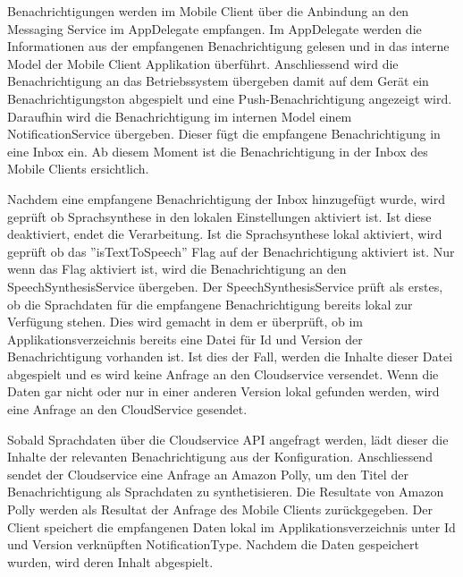 Benachrichtigungen werden im Mobile Client über die Anbindung an den Messaging Service im AppDelegate empfangen.
Im AppDelegate werden die Informationen aus der empfangenen Benachrichtigung gelesen und in das interne Model der Mobile Client Applikation überführt.
Anschliessend wird die Benachrichtigung an das Betriebssystem übergeben damit auf dem Gerät ein Benachrichtigungston abgespielt und eine Push-Benachrichtigung angezeigt wird.
Daraufhin wird die Benachrichtigung im internen Model einem NotificationService übergeben.
Dieser fügt die empfangene Benachrichtigung in eine Inbox ein.
Ab diesem Moment ist die Benachrichtigung in der Inbox des Mobile Clients ersichtlich.

Nachdem eine empfangene Benachrichtigung der Inbox hinzugefügt wurde, wird geprüft ob Sprachsynthese in den lokalen Einstellungen aktiviert ist.
Ist diese deaktiviert, endet die Verarbeitung.
Ist die Sprachsynthese lokal aktiviert, wird geprüft ob das ''isTextToSpeech'' Flag auf der Benachrichtigung aktiviert ist.
Nur wenn das Flag aktiviert ist, wird die Benachrichtigung an den SpeechSynthesisService übergeben.
Der SpeechSynthesisService prüft als erstes, ob die Sprachdaten für die empfangene Benachrichtigung bereits lokal zur Verfügung stehen.
Dies wird gemacht in dem er überprüft, ob im Applikationsverzeichnis bereits eine Datei für Id und Version der Benachrichtigung vorhanden ist.
Ist dies der Fall, werden die Inhalte dieser Datei abgespielt und es wird keine Anfrage an den Cloudservice versendet.
Wenn die Daten gar nicht oder nur in einer anderen Version lokal gefunden werden, wird eine Anfrage an den CloudService gesendet.

Sobald Sprachdaten über die Cloudservice API angefragt werden, lädt dieser die Inhalte der relevanten Benachrichtigung aus der Konfiguration.
Anschliessend sendet der Cloudservice eine Anfrage an Amazon Polly, um den Titel der Benachrichtigung als Sprachdaten zu synthetisieren.
Die Resultate von Amazon Polly werden als Resultat der Anfrage des Mobile Clients zurückgegeben.
Der Client speichert die empfangenen Daten lokal im Applikationsverzeichnis unter Id und Version verknüpften NotificationType.
Nachdem die Daten gespeichert wurden, wird deren Inhalt abgespielt.

